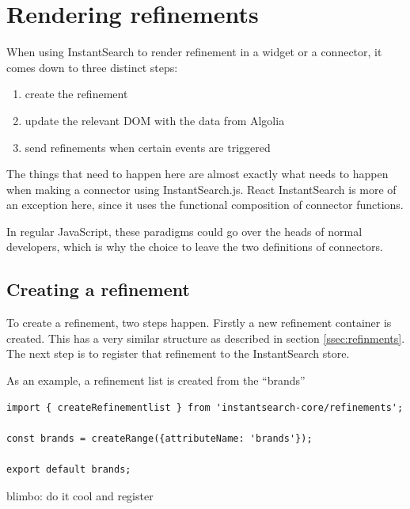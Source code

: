 
\section{Rendering refinements} %
\label{sec:rendering_refinements}

When using InstantSearch to render refinement in a widget or a connector, it comes down to three distinct steps:

\begin{enumerate}
  \item create the refinement
  \item update the relevant DOM with the data from Algolia
  \item send refinements when certain events are triggered
\end{enumerate}

The things that need to happen here are almost exactly what needs to happen when making a connector using InstantSearch.js. React InstantSearch is more of an exception here, since it uses the functional composition of connector functions.

In regular JavaScript, these paradigms could go over the heads of normal developers, which is why the choice to leave the two definitions of connectors.

\subsection{Creating a refinement}
\label{subs:creating_a_refinement}

To create a refinement, two steps happen. Firstly a new refinement container is created. This has a very similar structure as described in section \ref{ssec:refinments}. The next step is to register that refinement to the InstantSearch store.

As an example, a refinement list is created from the ``brands''  %

\begin{lstlisting}[caption={Creating a refinement},label={lst:creating-refinement}]
import { createRefinementlist } from 'instantsearch-core/refinements';

const brands = createRange({attributeName: 'brands'});

export default brands;
\end{lstlisting}

blimbo: do it cool and register %

